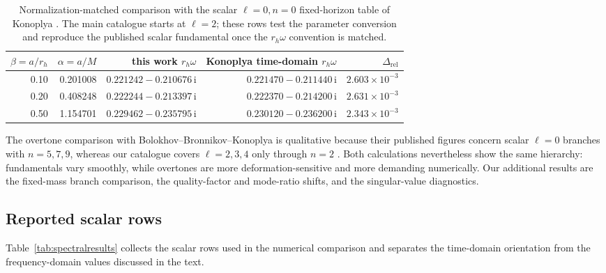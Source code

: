 \documentclass[12pt,a4paper]{article}
\newcommand{\ii}{\mathrm{i}}
\begin{document}
\begin{table}[H]
\centering
\footnotesize
\renewcommand{\arraystretch}{1.14}
\begin{tabular}{rrrrr}
\toprule
\(\beta=a/r_h\) & \(\alpha=a/M\) &
this work \(r_h\omega\) & Konoplya time-domain \(r_h\omega\) &
\(\Delta_{\mathrm{rel}}\)\\
\midrule
0.10 & 0.201008 & \(0.221242-0.210676\,\ii\) & \(0.221470-0.211440\,\ii\) & \(2.603\times10^{-3}\)\\
0.20 & 0.408248 & \(0.222244-0.213397\,\ii\) & \(0.222370-0.214200\,\ii\) & \(2.631\times10^{-3}\)\\
0.50 & 1.154701 & \(0.229462-0.235795\,\ii\) & \(0.230120-0.236200\,\ii\) & \(2.343\times10^{-3}\)\\
\bottomrule
\end{tabular}
\caption{Normalization-matched comparison with the scalar \(\ell=0,n=0\)
fixed-horizon table of Konoplya \cite{Konoplya2020}. The main catalogue starts
at \(\ell=2\); these rows test the parameter conversion and reproduce the
published scalar fundamental once the \(r_h\omega\) convention is matched.}
\label{tab:konoplyacomparison}
\end{table}

The overtone comparison with Bolokhov--Bronnikov--Konoplya is qualitative
because their published figures concern scalar \(\ell=0\) branches with
\(n=5,7,9\), whereas our catalogue covers \(\ell=2,3,4\) only through \(n=2\)
\cite{Bolokhov2025}. Both calculations nevertheless show the same hierarchy:
fundamentals vary smoothly, while overtones are more deformation-sensitive and
more demanding numerically. Our additional results are the fixed-mass branch
comparison, the quality-factor and mode-ratio shifts, and the singular-value
diagnostics.
\FloatBarrier

\subsection{Reported scalar rows}

Table~\ref{tab:spectralresults} collects the scalar rows used in the numerical
comparison and separates the time-domain orientation from the frequency-domain
values discussed in the text.
\end{document}
